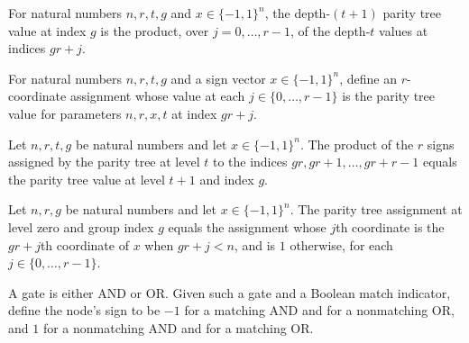 \begin{theorem}
\label{FABL.parityTreeValue_succ}
\leanok
{}
For natural numbers $n,r,t,g$ and $x\in\{-1,1\}^n$, the depth-$(t+1)$ parity tree value
at index $g$ is the product, over $j=0,\ldots,r-1$, of the depth-$t$ values at indices
$gr+j$.
\end{theorem}

\begin{definition}
\label{FABL.parityTreeAssignment}
\leanok
{}
For natural numbers $n,r,t,g$ and a sign vector $x\in\{−1,1\}^n$, define an
$r$-coordinate assignment whose value at each $j\in\{0,\ldots,r-1\}$ is the parity tree
value for parameters $n,r,x,t$ at index $gr+j$.
\end{definition}

\begin{theorem}
\label{FABL.parityBlockProduct_treeAssignment}
\leanok
{}
Let $n,r,t,g$ be natural numbers and let $x\in\{-1,1\}^n$. The product of the $r$ signs
assigned by the parity tree at level $t$ to the indices $gr,gr+1,\ldots,gr+r-1$ equals
the parity tree value at level $t+1$ and index $g$.
\end{theorem}

\begin{theorem}
\label{FABL.parityTreeAssignment_zero_eq_blockValue}
\leanok
{}
Let $n,r,g$ be natural numbers and let $x\in\{−1,1\}^n$. The parity tree assignment at
level zero and group index $g$ equals the assignment whose $j$th coordinate is the $g
r+j$th coordinate of $x$ when $g r+j<n$, and is $1$ otherwise, for each
$j\in\{0,\ldots,r-1\}$.
\end{theorem}

\begin{definition}
\label{FABL.parityExactNodeValue}
\leanok
{}
A gate is either AND or OR. Given such a gate and a Boolean match indicator, define the
node's sign to be $-1$ for a matching AND and for a nonmatching OR, and $1$ for a
nonmatching AND and for a matching OR.
\end{definition}

